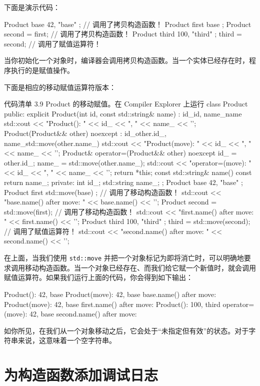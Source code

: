 下面是演示代码：

\begin{codebox}[cpp]
Product base { 42, "base" };
// 调用了拷贝构造函数！
Product first { base };
Product second = first;
// 调用了拷贝构造函数！
Product third { 100, "third" };
third = second; // 调用了赋值运算符！
\end{codebox}

当你初始化一个对象时，编译器会调用拷贝构造函数。当一个实体已经存在时，程序执行的是赋值操作。

下面是相应的移动赋值运算符版本：

\begin{codeboxt}[cpp]{代码清单 3.9 Product 的移动赋值。在 Compiler Explorer 上运行}
class Product {
public:
explicit Product(int id, const std::string& name)
: id_{id}, name_{name} {
std::cout << "Product(): " << id_ << ", " << name_ << '\n';
}
Product(Product&& other) noexcept
: id_{other.id_}, name_{std::move(other.name_)} {
std::cout << "Product(move): " << id_ << ", " << name_ << '\n';
}
Product& operator=(Product&& other) noexcept {
id_ = other.id_;
name_ = std::move(other.name_);
std::cout << "operator=(move): " << id_ << ", " << name_ << '\n';
return *this;
}
const std::string& name() const { return name_; }
private:
int id_;
std::string name_;
};
Product base { 42, "base" };
Product first { std::move(base) };
// 调用了移动构造函数！
std::cout << "base.name() after move: " << base.name() << '\n';
Product second = std::move(first);
// 调用了移动构造函数！
std::cout << "first.name() after move: " << first.name() << '\n';
Product third { 100, "third" };
third = std::move(second); // 调用了赋值运算符！
std::cout << "second.name() after move: " << second.name() << '\n';
\end{codeboxt}

在上面，当我们使用 \texttt{std::move} 并把一个对象标记为即将消亡时，可以明确地要求调用移动构造函数。当一个对象已经存在、而我们给它赋一个新值时，就会调用赋值运算符。如果我们运行上面的代码，你会得到如下输出：

\begin{codebox}[cpp]
Product(): 42, base
Product(move): 42, base
base.name() after move:
Product(move): 42, base
first.name() after move:
Product(): 100, third
operator=(move): 42, base
second.name() after move:
\end{codebox}

如你所见，在我们从一个对象移动之后，它会处于“未指定但有效”的状态。对于字符串来说，这意味着一个空字符串。

\section{为构造函数添加调试日志}

